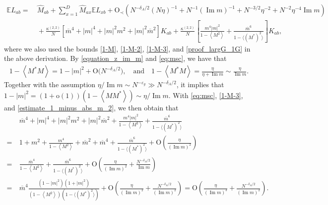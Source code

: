 \documentclass[10pt,reqno]{amsart}
\numberwithin{equation}{section}
\numberwithin{figure}{section}
\theoremstyle{plain} %
\theoremstyle{definition} %
\renewcommand{\epsilon}{\varepsilon}
\renewcommand{\bar}{\overline}
\newcommand{\pa}[1]{\left({#1}\right)}
\newcommand{\avga}[1]{\left\langle #1 \right\rangle}
\DeclareMathOperator{\im}{\mathrm{Im}}
\newcommand{\oo}{\mathrm{o}}
\newcommand{\OO}{\mathrm{O}}
\newcommand{\opr}[1]{\mathrm{O}_\prec\left({#1}\right)}
\numberwithin{equation}{section}
\begin{document}
\begin{align}
    \mathbb{E} L_{a b}
    = &~ \widehat{M}_{a b}+\sum_{x=1}^D \widehat{M}_{a x} \mathbb{E} L_{x b}+\opr{N^{-\delta_A / 2}(N \eta)^{-1}+N^{-1}(\operatorname{Im} m)^{-1}+N^{-3 / 2}\eta^{-2} +N^{-2}\eta^{-4} \im m} \nonumber\\
    &~ +\frac{\kappa^{(2,2)}}{N}\left[{\overline{m}}^4+\left|m\right|^4+\left|m\right|^2 m^2+\left|m\right|^2{\overline{m}}^2\right] K_{a b} +\frac{\kappa^{(2,2)}}{N}\left[\frac{m^4\left|m\right|^2}{1-\left\langle M^2\right\rangle}+\frac{{\overline{m}}^6}{1-\langle\left(M^*\right)^2\rangle}\right] K_{a b}\label{pre_cancellation},
\end{align}
where we also used the bounds \eqref{1-M}, \eqref{1-M-2}, \eqref{1-M-3}, and \eqref{proof_largG_1G} in the above derivation. By \eqref{equation_z_im_m} and \eqref{eq:msc}, we have that
\begin{equation}\label{estimate_1_minus_abs_m_2}
    \begin{aligned}
        1-\left\langle M^* M\right\rangle=1-|m|^2+\OO\big(N^{-\delta_A / 2}\big) ,\quad \text{and}\quad 1-\left\langle M^* M\right\rangle=\frac{\eta}{\eta+\operatorname{Im} m} \sim \frac{\eta}{\operatorname{Im} m}.
    \end{aligned}
\end{equation}
Together with the assumption $\eta / \operatorname{Im} m \sim N^{-\epsilon_g} \gg N^{-\delta_A / 2}$, it implies that $1-|m|^2=\pa{1+\oo\pa{1}}\pa{1-\avga{MM^*}} \sim {\eta}/{\operatorname{Im} m}$. With \eqref{eq:msc}, \eqref{1-M-3}, and \eqref{estimate_1_minus_abs_m_2}, we then obtain that
\begin{align*}
        &~\bar{m}^4 +|m|^4+|m|^2 m^2+|m|^2 \bar{m}^2+\frac{m^4|m|^2}{1-\left\langle M^2\right\rangle}+\frac{\bar{m}^6}{1-\langle\left(M^*\right)^2\rangle} \\
        =&~ 1+m^2+\frac{m^4}{1-\left\langle M^2\right\rangle}+\bar{m}^2+\bar{m}^4+\frac{\bar{m}^6}{1-\langle\left(M^*\right)^2\rangle}+\OO\left(\frac{\eta}{(\operatorname{Im} m)^2}\right) \\
        =&~ \frac{\bar{m}^4}{1-\left\langle M^2\right\rangle}+\frac{\bar{m}^6}{1-\langle\left(M^*\right)^2\rangle}+\OO\left(\frac{\eta}{(\operatorname{Im} m)^2}+\frac{N^{-\delta_A / 2}}{\operatorname{Im} m}\right) \\
        =&~ \bar{m}^4\frac{\left(1-|m|^2\right)\left(1+|m|^2\right)}{\left(1-\left\langle M^2\right\rangle\right)(1-\langle\left(M^*\right)^2\rangle)}+\OO\left(\frac{\eta}{(\operatorname{Im} m)^2}+\frac{N^{-\delta_A / 2}}{(\operatorname{Im} m)^2}\right) = \OO\left(\frac{\eta}{(\operatorname{Im} m)^3}+\frac{N^{-\delta_A / 2}}{(\operatorname{Im} m)^2}\right).
    \end{align*}
\end{document}
